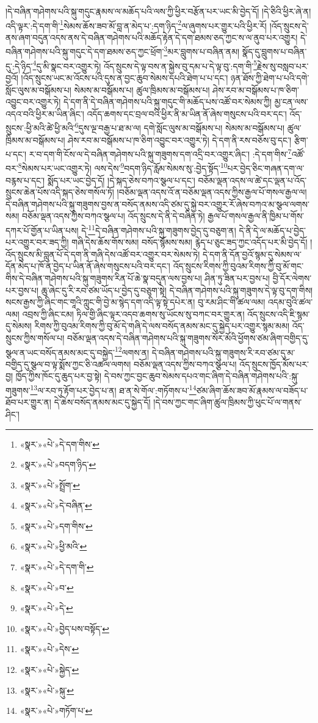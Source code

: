 །དེ་བཞིན་གཤེགས་པའི་སྐུ་གདུང་རྣམས་ལ་མཆོད་པའི་ལས་ཀྱི་ཕྱིར་བརྩོན་པར་ཡང་མི་བྱེད་དོ། །དེ་ཅིའི་ཕྱིར་ཞེ་ན། འདི་ལྟར་:དེ་དག་གི་\footnote{«སྣར་»«པེ་»དེ་དག་གིས་}སེམས་ཆོས་ཟབ་མོ་བླ་ན་མེད་པ་:དག་ཉིད་\footnote{«སྣར་»«པེ་»བདག་ཉིད་}ལ་ཞུགས་པར་གྱུར་པའི་ཕྱིར་རོ། །འོད་སྲུངས་དེ་ནས་ཞག་བདུན་འདས་ནས་དེ་བཞིན་གཤེགས་པའི་མཆོད་རྟེན་དེ་དག་ཐམས་ཅད་ཀྱང་ས་ལ་ནུབ་པར་འགྱུར། དེ་བཞིན་གཤེགས་པའི་སྐུ་གདུང་དེ་དག་ཐམས་ཅད་ཀྱང་ཕྲོག་\footnote{«སྣར་»«པེ་»སྤྲོག་}མར་བླུགས་པ་བཞིན་ནམ། སྣོད་དུ་བླུགས་པ་བཞིན་དུ་:དེ་ཉིད་\footnote{«སྣར་»«པེ་»དེ་བཞིན་}དུ་མི་སྣང་བར་འགྱུར་ཏེ། འོད་སྲུངས་དེ་ལྟ་བས་ན་སྐྱེས་བུ་དམ་པ་དེ་ལྟ་བུ་:དག་གི་\footnote{«སྣར་»«པེ་»དག་གིས་}རྗེས་སུ་བསླབ་པར་བྱའོ། །འོད་སྲུངས་ཡང་མ་འོངས་པའི་དུས་ན་བྱང་ཆུབ་སེམས་དཔའི་ཐེག་པ་པ་དང་། ཉན་ཐོས་ཀྱི་ཐེག་པ་པའི་དགེ་སློང་ལུས་མ་བསྒོམས་པ། སེམས་མ་བསྒོམས་པ། ཚུལ་ཁྲིམས་མ་བསྒོམས་པ། ཤེས་རབ་མ་བསྒོམས་པ་ཁ་ཅིག་འབྱུང་བར་འགྱུར་ཏེ། དེ་དག་ནི་དེ་བཞིན་གཤེགས་པའི་སྐུ་གདུང་གི་མཆོད་པས་འཚོ་བར་སེམས་ཀྱི། མྱ་ངན་ལས་འདའ་བའི་ཕྱིར་མ་ཡིན་ཞིང་། འདོད་ཆགས་དང་བྲལ་བའི་ཕྱིར་ནི་མ་ཡིན་ནོ་ཞེས་གསུངས་པའི་བར་དང་། འོད་སྲུངས་:ཕྱི་མའི་ཚེ་ཕྱི་མའི་\footnote{«སྣར་»«པེ་»ཕྱི་མའི་}དུས་ལྔ་བརྒྱ་པ་ཐ་མ་ལ། དགེ་སློང་ལུས་མ་བསྒོམས་པ། སེམས་མ་བསྒོམས་པ། ཚུལ་ཁྲིམས་མ་བསྒོམས་པ། ཤེས་རབ་མ་བསྒོམས་པ་ཁ་ཅིག་འབྱུང་བར་འགྱུར་ཏེ། དེ་དག་ནི་རས་བཅོས་བུ་དང་། རྩིག་པ་དང་། ར་བ་དག་གི་ངོས་ལ་དེ་བཞིན་གཤེགས་པའི་སྐུ་གཟུགས་དག་འདྲི་བར་འགྱུར་ཞིང་། :དེ་དག་གིས་\footnote{«སྣར་»«པེ་»དེ་དག་གི་}འཚོ་བར་\footnote{«སྣར་»«པེ་»བ་}སེམས་པར་ཡང་འགྱུར་ཏེ། ལས་དེས་\footnote{«སྣར་»«པེ་»དེ་}བདག་ཉིད་རློམ་སེམས་སུ་:བྱེད་སྟོད་\footnote{«སྣར་»«པེ་»བྱེད་པས་བསྟོད་}པར་བྱེད་ཅིང་གཞན་དག་ལ་བརྙས་པ་དང་། སྨོད་པར་ཡང་བྱེད་དོ། །དེ་སྐད་ཅེས་བཀའ་སྩལ་པ་དང་། བཅོམ་ལྡན་འདས་ལ་ཚེ་དང་ལྡན་པ་འོད་སྲུངས་ཆེན་པོས་འདི་སྐད་ཅེས་གསོལ་ཏོ། །བཅོམ་ལྡན་འདས་འོ་ན་བཅོམ་ལྡན་འདས་ཀྱིས་རྒྱལ་པོ་གསལ་རྒྱལ་ལ། དེ་བཞིན་གཤེགས་པའི་སྐུ་གཟུགས་བྱས་ན་བསོད་ནམས་འདི་ཙམ་དུ་སྐྱེ་བར་འགྱུར་རོ་ཞེས་བཀའ་མ་སྩལ་ལགས་སམ། བཅོམ་ལྡན་འདས་ཀྱིས་བཀའ་སྩལ་པ། འོད་སྲུངས་དེ་ནི་དེ་བཞིན་ཏེ། རྒྱལ་པོ་གསལ་རྒྱལ་ནི་ཁྱིམ་པ་གོས་དཀར་པོ་གྱོན་པ་ཡིན་པས། དེ་\footnote{«སྣར་»«པེ་»དེས་}དེ་བཞིན་གཤེགས་པའི་སྐུ་གཟུགས་བྱེད་དུ་བཅུག་ན། དེ་ནི་དེ་ལ་མཆོད་པ་བྱེད་པར་འགྱུར་བར་ཟད་ཀྱི། གཞི་དེས་ཆོས་གོས་སམ། བསོད་སྙོམས་སམ། རྙེད་པ་ཅུང་ཟད་ཀྱང་འདོད་པར་མི་བྱེད་དོ། །འོད་སྲུངས་མི་བླུན་པོ་དེ་དག་ནི་གཞི་དེས་འཚོ་བར་འགྱུར་བར་སེམས་ཏེ། དེ་དག་ནི་དོན་བྱའོ་སྙམ་དུ་སེམས་ལ་དོན་མེད་པ་ཁོ་ན་བྱེད་པ་ཡིན་ནོ་ཞེས་གསུངས་པའི་བར་དང་། འོད་སྲུངས་རིགས་ཀྱི་བུའམ་རིགས་ཀྱི་བུ་མོ་གང་གིས་དེ་བཞིན་གཤེགས་པའི་སྐུ་གཟུགས་རིན་པོ་ཆེ་སྣ་བདུན་ལས་བྱས་པ། ཤིན་ཏུ་ཟིན་པར་བྱས་པ། བྱི་དོར་ལེགས་པར་བྱས་པ། ཆུ་ཞེང་དུ་རི་རབ་ཙམ་ཡོད་པ་བྱེད་དུ་བཅུག་སྟེ། དེ་བཞིན་གཤེགས་པའི་སྐུ་གཟུགས་དེ་ལྟ་བུ་དག་གིས། སངས་རྒྱས་ཀྱི་ཞིང་གང་གཱའི་ཀླུང་གི་བྱེ་མ་སྙེད་དག་འདི་ལྟ་སྟེ་དཔེར་ན། བུ་རམ་ཤིང་གི་ཚལ་ལམ། འདམ་བུའི་ཚལ་ལམ། འབྲས་ཀྱི་ཞིང་ངམ། ཏིལ་གྱི་ཞིང་ལྟར་འདབ་ཆགས་སུ་ཡོངས་སུ་བཀང་བར་གྱུར་ན། འོད་སྲུངས་འདི་ཇི་སྙམ་དུ་སེམས། རིགས་ཀྱི་བུའམ་རིགས་ཀྱི་བུ་མོ་དེ་གཞི་དེ་ལས་བསོད་ནམས་མང་དུ་སྐྱེད་པར་འགྱུར་སྙམ་མམ། འོད་སྲུངས་ཀྱིས་གསོལ་པ། བཅོམ་ལྡན་འདས་དེ་བཞིན་གཤེགས་པའི་སྐུ་གཟུགས་སོར་མོའི་ཕྱོགས་ཙམ་ཞིག་བགྱིད་དུ་སྩལ་ན་ཡང་བསོད་ནམས་མང་དུ་བསྐྱེད་\footnote{«སྣར་»«པེ་»སྐྱེད་}ལགས་ན། དེ་བཞིན་གཤེགས་པའི་སྐུ་གཟུགས་རི་རབ་ཙམ་དུ་མ་བགྱིད་དུ་སྩལ་བ་ལྟ་སྨོས་ཀྱང་ཅི་འཚལ་ལགས། བཅོམ་ལྡན་འདས་ཀྱིས་བཀའ་སྩལ་པ། འོད་སྲུངས་ཁྱོད་མོས་པར་བྱ། ཁྱོད་ཀྱིས་ཁོང་དུ་ཆུད་པར་བྱ་སྟེ། དེ་བས་ཀྱང་བྱང་ཆུབ་སེམས་དཔའ་གང་ཞིག་དེ་བཞིན་གཤེགས་པའི་:སྐུ་གཟུགས་\footnote{«སྣར་»«པེ་»སྐུ་}ལ་རབ་ཏུ་རྟོག་པར་བྱེད་པ་ན། ཐ་ན་སེ་གོལ་:གཏོགས་པ་\footnote{«སྣར་»«པེ་»གཏོག་པ་}ཙམ་ཞིག་ཆོས་ཟབ་མོ་རྣམས་ལ་བཟོད་པ་ཐོབ་པར་གྱུར་ན། དེ་ཆེས་བསོད་ནམས་མང་དུ་སྐྱེད་དོ། །དེ་བས་ཀྱང་གང་ཞིག་ཚུལ་ཁྲིམས་ཀྱི་ཕུང་པོ་ལ་གནས་ཤིང་། 